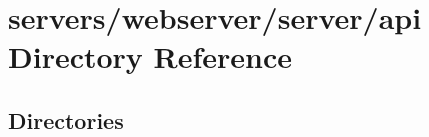 \section{servers/webserver/server/api Directory Reference}
\label{dir_30b342a22ba6d577a7f2e21c58f1d4f6}
\subsection*{Directories}
\begin{DoxyCompactItemize}
\end{DoxyCompactItemize}
